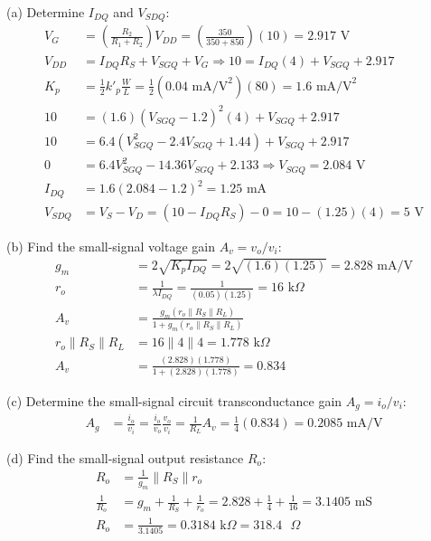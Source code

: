 \documentclass{article}
\begin{document}
(a) Determine $I_{DQ}$ and $V_{SDQ}$:
\begin{align*}
    V_G &= \left(\frac{R_2}{R_1 + R_2}\right) V_{DD} = \left(\frac{350}{350 + 850}\right)(10) = 2.917\text{ V} \\
    V_{DD} &= I_{DQ}R_S + V_{SGQ} + V_G \Rightarrow 10 = I_{DQ}(4) + V_{SGQ} + 2.917 \\
    K_p &= \frac{1}{2} k'_p \frac{W}{L} = \frac{1}{2} (0.04\text{ mA/V}^2)(80) = 1.6\text{ mA/V}^2 \\
    10 &= (1.6)(V_{SGQ} - 1.2)^2 (4) + V_{SGQ} + 2.917 \\
    10 &= 6.4(V_{SGQ}^2 - 2.4 V_{SGQ} + 1.44) + V_{SGQ} + 2.917 \\
    0 &= 6.4 V_{SGQ}^2 - 14.36 V_{SGQ} + 2.133 \Rightarrow V_{SGQ} = 2.084\text{ V} \\
    I_{DQ} &= 1.6(2.084 - 1.2)^2 = 1.25\text{ mA} \\
    V_{SDQ} &= V_S - V_D = (10 - I_{DQ}R_S) - 0 = 10 - (1.25)(4) = 5\text{ V}
\end{align*}

(b) Find the small-signal voltage gain $A_v = v_o/v_i$:
\begin{align*}
    g_m &= 2\sqrt{K_p I_{DQ}} = 2\sqrt{(1.6)(1.25)} = 2.828\text{ mA/V} \\
    r_o &= \frac{1}{\lambda I_{DQ}} = \frac{1}{(0.05)(1.25)} = 16\text{ k}\Omega \\
    A_v &= \frac{g_m (r_o \parallel R_S \parallel R_L)}{1 + g_m (r_o \parallel R_S \parallel R_L)} \\
    r_o \parallel R_S \parallel R_L &= 16 \parallel 4 \parallel 4 = 1.778\text{ k}\Omega \\
    A_v &= \frac{(2.828)(1.778)}{1 + (2.828)(1.778)} = 0.834
\end{align*}

(c) Determine the small-signal circuit transconductance gain $A_g = i_o/v_i$:
\begin{align*}
    A_g &= \frac{i_o}{v_i} = \frac{i_o}{v_o} \frac{v_o}{v_i} = \frac{1}{R_L} A_v = \frac{1}{4}(0.834) = 0.2085\text{ mA/V}
\end{align*}

(d) Find the small-signal output resistance $R_o$:
\begin{align*}
    R_o &= \frac{1}{g_m} \parallel R_S \parallel r_o \\
    \frac{1}{R_o} &= g_m + \frac{1}{R_S} + \frac{1}{r_o} = 2.828 + \frac{1}{4} + \frac{1}{16} = 3.1405\text{ mS} \\
    R_o &= \frac{1}{3.1405} = 0.3184\text{ k}\Omega = 318.4\text{ }\Omega
\end{align*}
\end{document}
